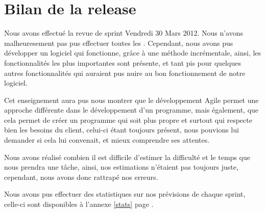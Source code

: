 \chapter{Bilan de la release}
Nous avons effectué la revue de sprint Vendredi 30 Mars 2012. Nous n'avons malheuresement pas pus
effectuer toutes les \USs{}. Cependant, nous avons pus développer un logiciel qui fonctionne, grâce
à une méthode incrémentale, ainsi, les fonctionnalités les plus importantes sont présente, et tant
pis pour quelques autres fonctionnalités qui auraient pus nuire au bon fonctionnement de notre logiciel.

Cet enseignement aura pus nous montrer que le développement Agile permet une approche différente dans
le développement d'un programme, mais également, que cela permet de créer un programme qui soit plus propre
et surtout qui respecte bien les besoins du client, celui-ci étant toujours présent, nous pouvions lui 
demander si cela lui convenait, et mieux comprendre ses attentes.

Nous avons réalisé combien il est difficile d'estimer la difficulté et le temps que nous prendra une tâche,
ainsi, nos estimations n'étaient pas toujours juste, cependant, nous avons donc rattrapé nos erreurs.

Nous avons pus effectuer des statistiques sur nos prévisions de chaque sprint, celle-ci sont disponibles
à l'annexe \ref{stats} page \pageref{stats}.


